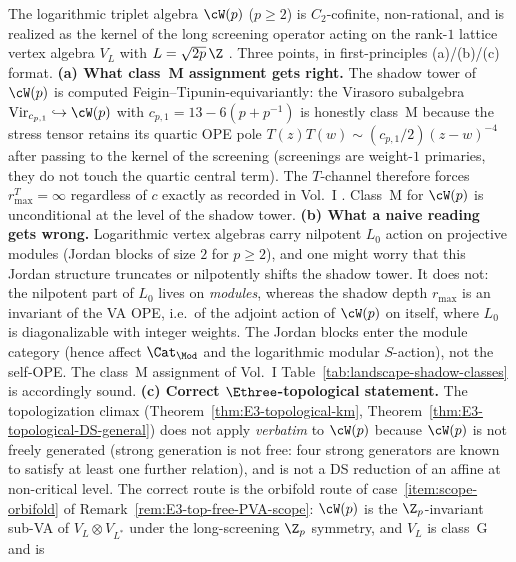 \begin{remark}%
\label{rem:wp-class-M-and-E3}%
%
The logarithmic triplet algebra $\cW(p)$ ($p\ge 2$) is
$C_2$-cofinite, non-rational, and is realized as the kernel of
the long screening operator acting on the rank-$1$ lattice
vertex algebra $V_L$ with $L=\sqrt{2p}\,\Z$
\cite{AdamovicMilas08,FeiginTipunin10}.
Three points, in first-principles (a)/(b)/(c) format.
\textbf{(a) What class~M assignment gets right.} The shadow
tower of $\cW(p)$ is computed Feigin--Tipunin-equivariantly:
the Virasoro subalgebra $\mathrm{Vir}_{c_{p,1}}\hookrightarrow\cW(p)$
with $c_{p,1}=13-6(p+p^{-1})$ is honestly class~M because the
stress tensor retains its quartic OPE pole
$T(z)T(w)\sim(c_{p,1}/2)(z-w)^{-4}$ after passing to the kernel of
the screening (screenings are weight-$1$ primaries, they do not
touch the quartic central term). The $T$-channel therefore forces
$r_{\max}^T=\infty$ regardless of $c$ exactly as recorded in
Vol.~I \cite[\S\ref{V1-sec:wp-shadow-depth}]{VolI}. Class~M for
$\cW(p)$ is unconditional at the level of the shadow tower.
\textbf{(b) What a naive reading gets wrong.} Logarithmic
vertex algebras carry nilpotent $L_0$ action on projective
modules (Jordan blocks of size $2$ for $p\ge 2$), and one might
worry that this Jordan structure truncates or nilpotently shifts
the shadow tower. It does not: the nilpotent part of $L_0$ lives
on \emph{modules}, whereas the shadow depth $r_{\max}$ is an
invariant of the VA OPE, i.e.\ of the adjoint action of $\cW(p)$
on itself, where $L_0$ is diagonalizable with integer weights.
The Jordan blocks enter the module category (hence affect $\Cat_{\Mod}$
and the logarithmic modular $S$-action), not the self-OPE. The
class~M assignment of Vol.~I
Table~\ref{tab:landscape-shadow-classes} is accordingly sound.
\textbf{(c) Correct $\Ethree$-topological statement.} The
topologization climax
(Theorem~\ref{thm:E3-topological-km}, Theorem~\ref{thm:E3-topological-DS-general})
does not apply \emph{verbatim} to $\cW(p)$ because $\cW(p)$ is
not freely generated (strong generation is not free: four strong
generators are known to satisfy at least one further relation),
and is not a DS reduction of an
affine at non-critical level. The correct route is the
orbifold route of case~\ref{item:scope-orbifold} of
Remark~\ref{rem:E3-top-free-PVA-scope}: $\cW(p)$ is the
$\Z_p$-invariant sub-VA of $V_L\otimes V_{L^*}$ under the
long-screening $\Z_p$ symmetry, and $V_L$ is class~G and is

\end{remark}
